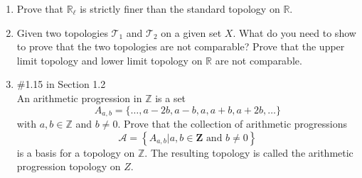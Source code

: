 \documentclass[12pt]{article}
\newcommand{\R}{\mathbb{R}}
\newcommand{\TT}{\mathcal{T}}
\begin{document}
\begin{enumerate}
\item Prove that $\R_\ell$ is strictly finer than the standard topology on $\R$.

\item Given two topologies $\TT_1$ and $\TT_2$ on a given set $X$. What do you need to show to prove that the two topologies are not comparable? Prove that the upper limit topology and lower limit topology on $\R$ are not comparable. 

\item \#1.15 in Section 1.2\\
An arithmetic progression in $\mathbb{Z}$ is a set
$$
A_{a, b}=\{\ldots, a-2 b, a-b, a, a+b, a+2 b, \ldots\}
$$
with $a, b \in \mathbb{Z}$ and $b \neq 0 .$ Prove that the collection of arithmetic progressions
$$
\mathcal{A}=\left\{A_{a, b} | a, b \in \mathbf{Z} \text { and } b \neq 0\right\}
$$
is a basis for a topology on $\mathbb{Z}$. The resulting topology is called the arithmetic progression topology on $Z .$


\end{enumerate}
\end{document}
